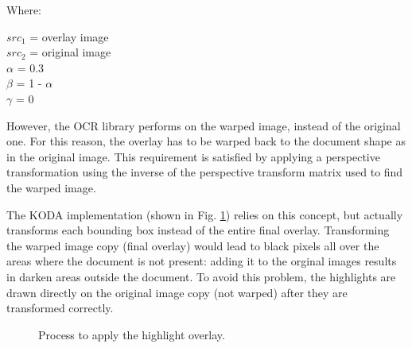 \documentclass[a4paper]{article}
\begin{document}
Where:

\begin{center}
	$src_1$ = overlay image \\
	$src_2$ = original image \\
	$\alpha$ = 0.3  \\
	$\beta$ = 1 - $\alpha$ \\
	$\gamma$ = 0 
\end{center}

However, the OCR library performs on the warped image, instead of the original one. For this reason, the overlay has to be warped back to the document shape as in the original image. This requirement is satisfied by applying a perspective transformation using the inverse of the perspective transform matrix used to find the warped image. 

The KODA implementation (shown in Fig. \ref{fig:keywordhighliting}) relies on this concept, but actually transforms each bounding box instead of the entire final overlay. Transforming the warped image copy (final overlay) would lead to black pixels all over the areas where the document is not present: adding it to the orginal images results in darken areas outside the document. To avoid this problem, the highlights are drawn directly on the original image copy (not warped) after they are transformed correctly.

\begin{figure}[H]
	\caption{Process to apply the highlight overlay.}
	\label{fig:keywordhighliting}
\end{figure}
\end{document}
